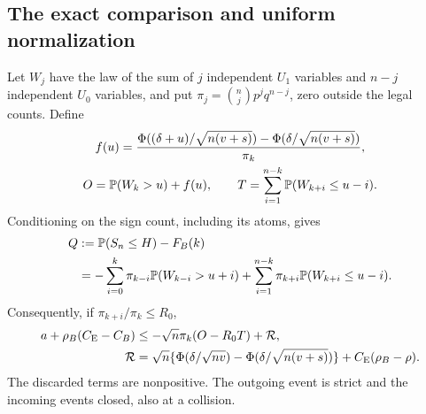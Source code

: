 \subsection{The exact comparison and uniform normalization}
Let $W_j$ have the law of the sum of $j$ independent $U_1$ variables and
$n-j$ independent $U_0$ variables, and put
$\pi_j=\binom njp^jq^{n-j}$, zero outside the legal counts. Define
\[
 \begin{gathered}
 f(u)=\frac{\Phi((\delta+u)/\sqrt{n(v+s)})-
                   \Phi(\delta/\sqrt{n(v+s)})}{\pi_k},\\
 O=\mathbb P(W_k>u)+f(u),\qquad
 T=\sum_{i=1}^{n-k}\mathbb P(W_{k+i}\le u-i).
 \end{gathered}
\]
Conditioning on the sign count, including its atoms, gives
\[
 \begin{aligned}
 Q&:=\mathbb P(S_n\le H)-F_B(k)\\
  &=-\sum_{i=0}^k\pi_{k-i}\mathbb P(W_{k-i}>u+i)
   +\sum_{i=1}^{n-k}\pi_{k+i}\mathbb P(W_{k+i}\le u-i).
 \end{aligned}
\]
Consequently, if $\pi_{k+i}/\pi_k\le R_0$,
\begin{equation}\label{v10:smallnoise:comparison}
 \begin{aligned}
 a+\rho_B(C_{\mathrm E}-C_B)&\le-\sqrt n\pi_k(O-R_0T)+\mathcal R,\\
 \mathcal R&=\sqrt n\{\Phi(\delta/\sqrt{nv})-
                  \Phi(\delta/\sqrt{n(v+s)})\}+C_{\mathrm E}(\rho_B-\rho).
 \end{aligned}
\end{equation}
The discarded terms are nonpositive. The outgoing event is strict and
the incoming events closed, also at a collision.

